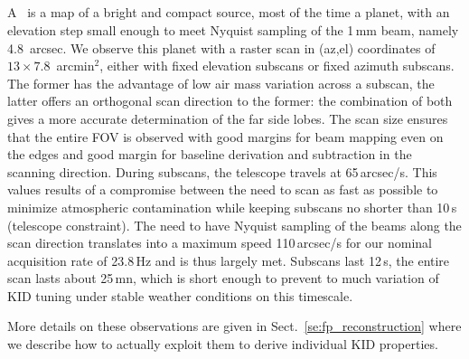 \subsection{\bms}
\label{se:beammaps}

A \bm\ is a map of a bright and compact source, most of the time
a planet, with an elevation step small enough to meet Nyquist sampling of the
1\,mm beam, namely 4.8~arcsec. We observe this planet with a raster scan in
(az,el) coordinates of $13\times7.8$~arcmin$^2$, either with fixed elevation subscans or fixed azimuth
subscans. The former has the advantage of low air mass variation across a
subscan, the latter offers an orthogonal scan direction to the former: the
combination of both gives a more accurate determination of the far side
lobes. The scan size ensures that the entire FOV is
observed with good margins for beam mapping even on the edges and good margin
for baseline derivation and subtraction in the scanning direction. During
subscans, the telescope travels at 65\,arcsec/s. This values
results of a compromise between the need to scan as fast as possible to minimize
atmospheric contamination while keeping subscans no shorter than 10\,s
(telescope constraint). The need to have Nyquist sampling of the beams along the
scan direction translates into a maximum speed 110\,arcsec/s for our nominal
acquisition rate of 23.8\,Hz and is thus largely met. Subscans last 12\,s, the
entire scan lasts about 25\,mn, which is short enough to prevent to much
variation of KID tuning under stable weather conditions on this timescale.




 More details on these observations are given in
Sect.~\ref{se:fp_reconstruction} where we describe how to actually exploit them
to derive individual KID properties.


